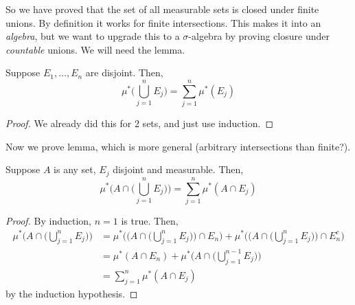   So we have proved that the set of all measurable sets is closed under finite unions. By definition it works for finite intersections. This makes it into an \textit{algebra}, but we want to upgrade this to a $\sigma$-algebra by proving closure under \textit{countable} unions. We will need the lemma. 

  \begin{lemma} 
    Suppose $E_1, \ldots, E_n$ are disjoint. Then, 
    \begin{equation}
      \mu^\ast \bigg( \bigcup_{j=1}^n E_j \bigg) = \sum_{j=1}^n \mu^\ast (E_j)
    \end{equation}
  \end{lemma}
  \begin{proof}
    We already did this for 2 sets, and just use induction. 
  \end{proof} 

  Now we prove lemma, which is more general (arbitrary intersections than finite?). 

  \begin{lemma} 
    Suppose $A$ is any set, $E_j$ disjoint and measurable. Then, 
    \begin{equation}
      \mu^\ast \bigg( A \cap \Big( \bigcup_{j=1}^n E_j \Big) \bigg) = \sum_{j=1}^n \mu^\ast (A \cap E_j)
    \end{equation}
  \end{lemma}
  \begin{proof}
    By induction, $n = 1$ is true. Then, 
    \begin{align}
      \mu^\ast \bigg( A \cap \Big( \bigcup_{j=1}^n E_j \Big) \bigg) 
        & = \mu^\ast \Bigg( \bigg( A \cap \Big( \bigcup_{j=1}^n E_j \Big) \bigg) \cap E_n \Bigg) + \mu^\ast \Bigg( \bigg( A \cap \Big( \bigcup_{j=1}^n E_j \Big) \bigg) \cap E_n^c \Bigg) \\  
        & = \mu^\ast (A \cap E_n) + \mu^\ast \bigg( A \cap \Big( \bigcup_{j=1}^{n-1} E_j \Big) \bigg) \\ 
        & = \sum_{j=1}^n \mu^\ast (A \cap E_j)
    \end{align}
    by the induction hypothesis. 
  \end{proof}

